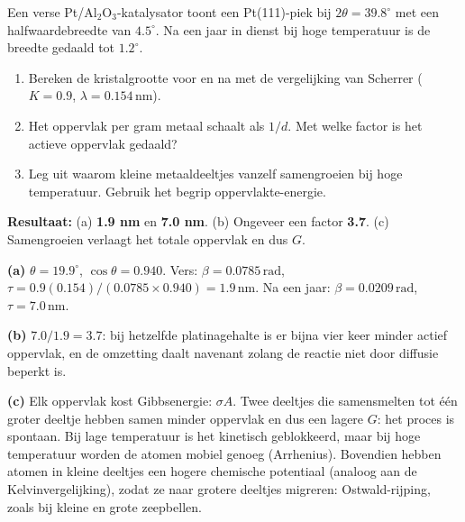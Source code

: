 \begin{oefening}
Een verse Pt/Al\(_2\)O\(_3\)-katalysator toont een Pt(111)-piek bij \(2\theta = 39.8^\circ\) met een halfwaardebreedte van \(4.5^\circ\). Na een jaar in dienst bij hoge temperatuur is de breedte gedaald tot \(1.2^\circ\).

\begin{enumerate}
\item[(a)]
  Bereken de kristalgrootte voor en na met de vergelijking van Scherrer (\(K = 0.9\), \(\lambda = 0.154\,\mathrm{nm}\)).
\item[(b)]
  Het oppervlak per gram metaal schaalt als \(1/d\). Met welke factor is het actieve oppervlak gedaald?
\item[(c)]
  Leg uit waarom kleine metaaldeeltjes vanzelf samengroeien bij hoge temperatuur. Gebruik het begrip oppervlakte-energie.
\end{enumerate}
\end{oefening}
\begin{oplossing}
\textbf{Resultaat:} (a) \textbf{1.9 nm} en \textbf{7.0 nm}. (b) Ongeveer een factor \textbf{3.7}. (c) Samengroeien verlaagt het totale oppervlak en dus \(G\).

\textbf{(a)} \(\theta = 19.9^\circ\), \(\cos\theta = 0.940\). Vers: \(\beta = 0.0785\,\mathrm{rad}\), \(\tau = 0.9(0.154)/(0.0785 \times 0.940) = 1.9\,\mathrm{nm}\). Na een jaar: \(\beta = 0.0209\,\mathrm{rad}\), \(\tau = 7.0\,\mathrm{nm}\).

\textbf{(b)} \(7.0/1.9 = 3.7\): bij hetzelfde platinagehalte is er bijna vier keer minder actief oppervlak, en de omzetting daalt navenant zolang de reactie niet door diffusie beperkt is.

\textbf{(c)} Elk oppervlak kost Gibbsenergie: \(\sigma A\). Twee deeltjes die samensmelten tot \'e\'en groter deeltje hebben samen minder oppervlak en dus een lagere \(G\): het proces is spontaan. Bij lage temperatuur is het kinetisch geblokkeerd, maar bij hoge temperatuur worden de atomen mobiel genoeg (Arrhenius). Bovendien hebben atomen in kleine deeltjes een hogere chemische potentiaal (analoog aan de Kelvinvergelijking), zodat ze naar grotere deeltjes migreren: Ostwald-rijping, zoals bij kleine en grote zeepbellen.
\end{oplossing}
